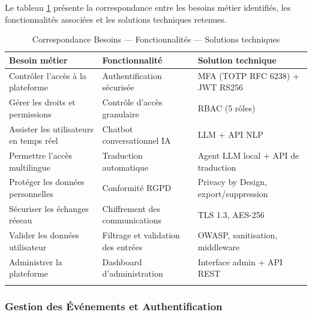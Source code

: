 Le tableau \ref{tab:correspondance} présente la correspondance entre les besoins métier identifiés, les fonctionnalités associées et les solutions techniques retenues.

\begin{longtable}{|m{4cm}|m{4cm}|m{5cm}|}
\hline
\textbf{Besoin métier} & \textbf{Fonctionnalité} & \textbf{Solution technique} \\
\hline
\endhead
\endfoot
\endlastfoot
\hline
Contrôler l'accès à la plateforme & Authentification sécurisée & MFA (TOTP RFC 6238) + JWT RS256 \\
\hline
Gérer les droits et permissions & Contrôle d'accès granulaire & RBAC (5 rôles) \\
\hline
Assister les utilisateurs en temps réel & Chatbot conversationnel IA & LLM + API NLP \\
\hline
Permettre l'accès multilingue & Traduction automatique & Agent LLM local + API de traduction \\
\hline
Protéger les données personnelles & Conformité RGPD & Privacy by Design, export/suppression \\
\hline
Sécuriser les échanges réseau & Chiffrement des communications & TLS 1.3, AES-256 \\
\hline
Valider les données utilisateur & Filtrage et validation des entrées & OWASP, sanitisation, middleware \\
\hline
Administrer la plateforme & Dashboard d'administration & Interface admin + API REST \\
\hline
\captionsetup{justification=centering,margin=2cm}
\caption{Correspondance Besoins — Fonctionnalités — Solutions techniques}
\label{tab:correspondance}
\end{longtable}

\subsubsection{Gestion des Événements et Authentification}

